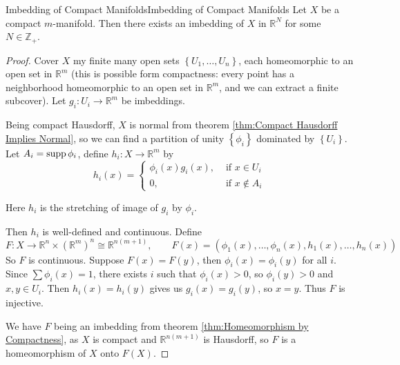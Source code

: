 \documentclass[../main.tex]{subfiles}
\begin{document}
\begin{theorem}{Imbedding of Compact Manifolds}{Imbedding of Compact Manifolds}
	Let $X$ be a compact $m$-manifold. Then there exists an imbedding of $X$ in $\mathbb{R}^{N}$ for some $N\in \mathbb{Z}_+$.
\end{theorem}
\begin{proof}
	Cover $X$ my finite many open sets $\left\{ U_1, \ldots ,U_n \right\}$, each homeomorphic to an open set in $\mathbb{R}^m$ (this is possible form compactness: every point has a neighborhood homeomorphic to an open set in $\mathbb{R}^m$, and we can extract a finite subcover). Let $g_i:U_i \rightarrow \mathbb{R}^m$ be imbeddings.

	Being compact Hausdorff, $X$ is normal from theorem \ref{thm:Compact Hausdorff Implies Normal}, so we can find a partition of unity $\left\{ \phi_i \right\}$ dominated by $\left\{ U_i \right\}$. Let $A_i = \operatorname{supp} \phi_i$, define $h_i:X \rightarrow \mathbb{R}^m$ by
	\begin{equation*}
		h_i(x) = 
		\begin{cases}
			\phi_i(x) g_i(x), &\text{ if } x\in U_i \\
			0, &\text{ if } x\notin A_i
		\end{cases}
	\end{equation*}
	\begin{remark}
		Here $h_i$ is the stretching of image of $g_i$ by $\phi_i$.
	\end{remark}
	Then $h_i$ is well-defined and continuous. Define
	\begin{equation*}
		F: X \rightarrow \mathbb{R}^n \times (\mathbb{R}^m)^n \cong \mathbb{R}^{n(m+1)}, \qquad F(x) = (\phi_1(x), \ldots ,\phi_n(x), h_1(x), \ldots ,h_n(x))
	\end{equation*}
	So $F$ is continuous. Suppose $F(x) = F(y)$, then $\phi_i(x) = \phi_i(y)$ for all $i$. Since $\sum \phi_i(x) = 1$, there exists $i$ such that $\phi_i(x) > 0$, so $\phi_i(y) > 0$ and $x,y\in U_i$. Then $h_i(x) = h_i(y)$ gives us $g_i(x) = g_i(y)$, so $x=y$. Thus $F$ is injective.

	We have $F$ being an imbedding from theorem 
	\ref{thm:Homeomorphism by Compactness}, as $X$ is compact and $\mathbb{R}^{n(m+1)}$ is Hausdorff, so $F$ is a homeomorphism of $X$ onto $F(X)$.
\end{proof}
\end{document}
